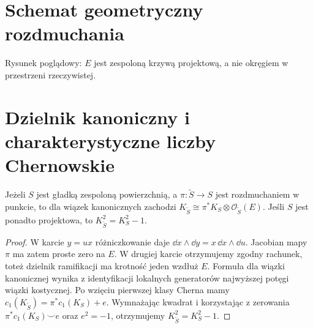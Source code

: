 \section{Schemat geometryczny rozdmuchania}
\begin{center}
\par\smallskip\small Rysunek poglądowy: $E$ jest zespoloną krzywą projektową,
a nie okręgiem w przestrzeni rzeczywistej.
\end{center}

\section{Dzielnik kanoniczny i charakterystyczne liczby Chernowskie}
\begin{twierdzenie}
\label{thm:xvii-canonical}
Jeżeli $S$ jest gładką zespoloną powierzchnią,
a $\pi:\widetilde S\to S$ jest rozdmuchaniem w punkcie,
to dla wiązek kanonicznych zachodzi
$K_{\widetilde S}\cong\pi^*K_S\otimes\mathcal O_{\widetilde S}(E)$.
Jeśli $S$ jest ponadto projektowa, to
$K_{\widetilde S}^2=K_S^2-1$.
\end{twierdzenie}
\begin{proof}
W karcie $y=ux$ różniczkowanie daje
$\dd x\wedge\dd y=x\,\dd x\wedge\dd u$.
Jacobian mapy $\pi$ ma zatem proste zero na $E$.
W drugiej karcie otrzymujemy zgodny rachunek, toteż
dzielnik ramifikacji ma krotność jeden wzdłuż $E$.
Formuła dla wiązki kanonicznej wynika z identyfikacji
lokalnych generatorów najwyższej potęgi wiązki kostycznej.
Po wzięciu pierwszej klasy Cherna mamy
$c_1(K_{\widetilde S})=\pi^*c_1(K_S)+e$.
Wymnażając kwadrat i korzystając z zerowania
$\pi^*c_1(K_S)\smile e$ oraz $e^2=-1$,
otrzymujemy $K_{\widetilde S}^2=K_S^2-1$.
\end{proof}

